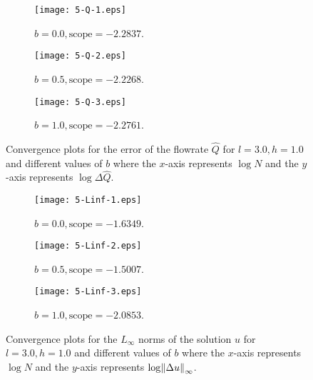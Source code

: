 \documentclass{assignment}[2019/10/15]
\begin{document}
    \begin{figure}[htb]
        \begin{subfigure}[b]{0.32\textwidth}
            \centering
            \texttt{[image: 5-Q-1.eps]}
            \caption{$b = 0.0, \text{scope} = -2.2837$.}
        \end{subfigure}
        \hfill
        \begin{subfigure}[b]{0.32\textwidth}
            \centering
            \texttt{[image: 5-Q-2.eps]}
            \caption{$b = 0.5, \text{scope} = -2.2268$.}
        \end{subfigure}
        \hfill
        \begin{subfigure}[b]{0.32\textwidth}
            \centering
            \texttt{[image: 5-Q-3.eps]}
            \caption{$b = 1.0, \text{scope} = -2.2761$.}
        \end{subfigure}
        \caption{Convergence plots for the error of the flowrate $\hat Q$ for $l = 3.0, h = 1.0$ and different values of $b$ where the $x$-axis represents $\log N$ and the $y$-axis represents $\log \Delta \hat{Q}$.}
        \label{fig: q5-Q}
    \end{figure}

    \begin{figure}[htb]
        \begin{subfigure}[b]{0.32\textwidth}
            \centering
            \texttt{[image: 5-Linf-1.eps]}
            \caption{$b = 0.0, \text{scope} = -1.6349$.}
        \end{subfigure}
        \hfill
        \begin{subfigure}[b]{0.32\textwidth}
            \centering
            \texttt{[image: 5-Linf-2.eps]}
            \caption{$b = 0.5, \text{scope} = -1.5007$.}
        \end{subfigure}
        \hfill
        \begin{subfigure}[b]{0.32\textwidth}
            \centering
            \texttt{[image: 5-Linf-3.eps]}
            \caption{$b = 1.0, \text{scope} = -2.0853$.}
        \end{subfigure}
        \caption{Convergence plots for the $L_\infty$ norms of the solution $u$ for $l = 3.0, h = 1.0$ and different values of $b$ where the $x$-axis represents $\log N$ and the $y$-axis represents $\log  \norm{\Delta u}_\infty$.}
        \label{fig: q5-Linf}
    \end{figure}
\end{document}
